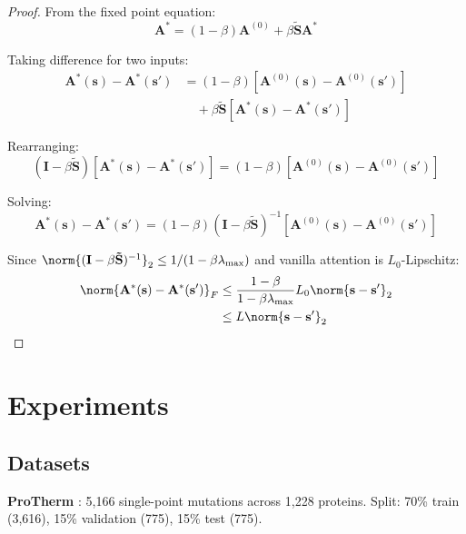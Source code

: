 \documentclass[12pt,en]{elegantpaper}
\begin{document}
\begin{proof}
From the fixed point equation:
\begin{equation}
    \mathbf{A}^* = (1-\beta) \mathbf{A}^{(0)} + \beta \mathbf{\tilde{S}} \mathbf{A}^*
\end{equation}

Taking difference for two inputs:
\begin{align}
    \mathbf{A}^*(\mathbf{s}) - \mathbf{A}^*(\mathbf{s}') &= (1-\beta)[\mathbf{A}^{(0)}(\mathbf{s}) - \mathbf{A}^{(0)}(\mathbf{s}')] \\
    &\quad + \beta \mathbf{\tilde{S}} [\mathbf{A}^*(\mathbf{s}) - \mathbf{A}^*(\mathbf{s}')]
\end{align}

Rearranging:
\begin{equation}
    (\mathbf{I} - \beta \mathbf{\tilde{S}})[\mathbf{A}^*(\mathbf{s}) - \mathbf{A}^*(\mathbf{s}')] = (1-\beta)[\mathbf{A}^{(0)}(\mathbf{s}) - \mathbf{A}^{(0)}(\mathbf{s}')]
\end{equation}

Solving:
\begin{equation}
    \mathbf{A}^*(\mathbf{s}) - \mathbf{A}^*(\mathbf{s}') = (1-\beta)(\mathbf{I} - \beta \mathbf{\tilde{S}})^{-1} [\mathbf{A}^{(0)}(\mathbf{s}) - \mathbf{A}^{(0)}(\mathbf{s}')]
\end{equation}

Since $\norm{(\mathbf{I} - \beta \mathbf{\tilde{S}})^{-1}}_2 \leq 1/(1-\beta\lambda_{\max})$ and vanilla attention is $L_0$-Lipschitz:
\begin{align}
    \norm{\mathbf{A}^*(\mathbf{s}) - \mathbf{A}^*(\mathbf{s}')}_F &\leq \frac{1-\beta}{1-\beta\lambda_{\max}} L_0 \norm{\mathbf{s} - \mathbf{s}'}_2 \\
    &\leq L \norm{\mathbf{s} - \mathbf{s}'}_2
\end{align}
\end{proof}

\section{Experiments}
\label{sec:experiments}

\subsection{Datasets}

\textbf{ProTherm} \citep{kumar2006protherm}: 5,166 single-point mutations across 1,228 proteins. Split: 70\% train (3,616), 15\% validation (775), 15\% test (775).
\end{document}
